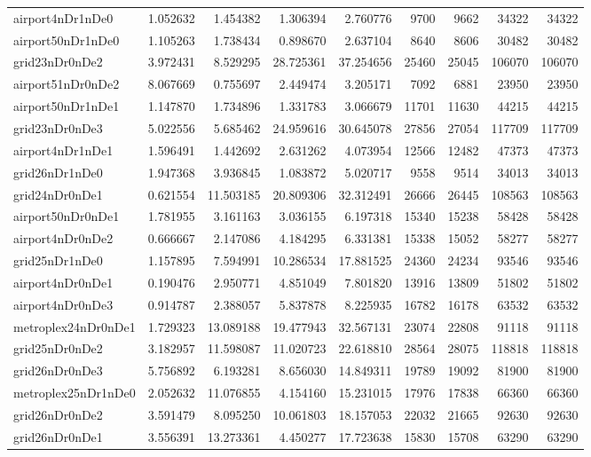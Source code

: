 \begin{longtable}{|l|r|r|r|r|r|r|r|r|}
airport4nDr1nDe0 & 1.052632 & 1.454382 & 1.306394 & 2.760776 & 9700 & 9662 & 34322 & 34322 \\
airport50nDr1nDe0 & 1.105263 & 1.738434 & 0.898670 & 2.637104 & 8640 & 8606 & 30482 & 30482 \\
grid23nDr0nDe2 & 3.972431 & 8.529295 & 28.725361 & 37.254656 & 25460 & 25045 & 106070 & 106070 \\
airport51nDr0nDe2 & 8.067669 & 0.755697 & 2.449474 & 3.205171 & 7092 & 6881 & 23950 & 23950 \\
airport50nDr1nDe1 & 1.147870 & 1.734896 & 1.331783 & 3.066679 & 11701 & 11630 & 44215 & 44215 \\
grid23nDr0nDe3 & 5.022556 & 5.685462 & 24.959616 & 30.645078 & 27856 & 27054 & 117709 & 117709 \\
airport4nDr1nDe1 & 1.596491 & 1.442692 & 2.631262 & 4.073954 & 12566 & 12482 & 47373 & 47373 \\
grid26nDr1nDe0 & 1.947368 & 3.936845 & 1.083872 & 5.020717 & 9558 & 9514 & 34013 & 34013 \\
grid24nDr0nDe1 & 0.621554 & 11.503185 & 20.809306 & 32.312491 & 26666 & 26445 & 108563 & 108563 \\
airport50nDr0nDe1 & 1.781955 & 3.161163 & 3.036155 & 6.197318 & 15340 & 15238 & 58428 & 58428 \\
airport4nDr0nDe2 & 0.666667 & 2.147086 & 4.184295 & 6.331381 & 15338 & 15052 & 58277 & 58277 \\
grid25nDr1nDe0 & 1.157895 & 7.594991 & 10.286534 & 17.881525 & 24360 & 24234 & 93546 & 93546 \\
airport4nDr0nDe1 & 0.190476 & 2.950771 & 4.851049 & 7.801820 & 13916 & 13809 & 51802 & 51802 \\
airport4nDr0nDe3 & 0.914787 & 2.388057 & 5.837878 & 8.225935 & 16782 & 16178 & 63532 & 63532 \\
metroplex24nDr0nDe1 & 1.729323 & 13.089188 & 19.477943 & 32.567131 & 23074 & 22808 & 91118 & 91118 \\
grid25nDr0nDe2 & 3.182957 & 11.598087 & 11.020723 & 22.618810 & 28564 & 28075 & 118818 & 118818 \\
grid26nDr0nDe3 & 5.756892 & 6.193281 & 8.656030 & 14.849311 & 19789 & 19092 & 81900 & 81900 \\
metroplex25nDr1nDe0 & 2.052632 & 11.076855 & 4.154160 & 15.231015 & 17976 & 17838 & 66360 & 66360 \\
grid26nDr0nDe2 & 3.591479 & 8.095250 & 10.061803 & 18.157053 & 22032 & 21665 & 92630 & 92630 \\
grid26nDr0nDe1 & 3.556391 & 13.273361 & 4.450277 & 17.723638 & 15830 & 15708 & 63290 & 63290 \\

\end{longtable}
